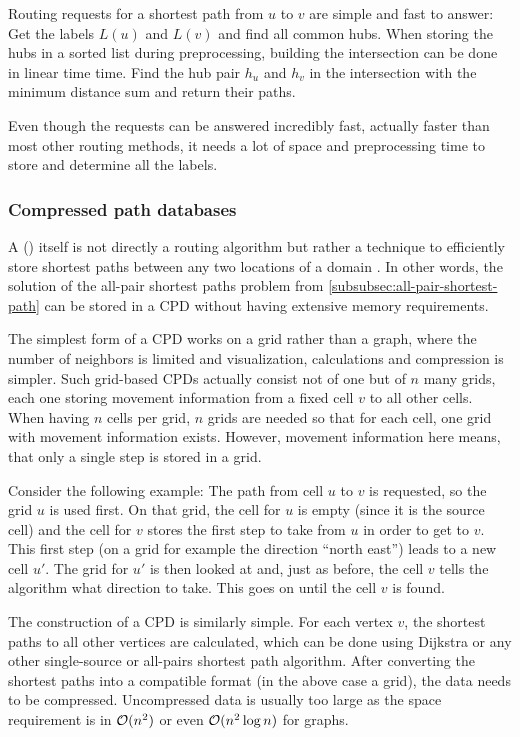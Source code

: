 			Routing requests for a shortest path from $u$ to $v$ are simple and fast to answer:
			Get the labels $L(u)$ and $L(v)$ and find all common hubs.
			When storing the hubs in a sorted list during preprocessing, building the intersection can be done in linear time time.
			Find the hub pair $h_u$ and $h_v$ in the intersection with the minimum distance sum and return their paths.
			
			Even though the requests can be answered incredibly fast, actually faster than most other routing methods, it needs a lot of space and preprocessing time to store and determine all the labels.
		
		\subsubsection{Compressed path databases}
		\label{subsubsec:cpd}
		
			A  () itself is not directly a routing algorithm but rather a technique to efficiently store shortest paths between any two locations of a domain \cite{botea-cpd-2013}.
			In other words, the solution of the all-pair shortest paths problem from \cref{subsubsec:all-pair-shortest-path} can be stored in a CPD without having extensive memory requirements.
			
			The simplest form of a CPD works on a grid rather than a graph, where the number of neighbors is limited and visualization, calculations and compression is simpler.
			Such grid-based CPDs actually consist not of one but of $n$ many grids, each one storing movement information from a fixed cell $v$ to all other cells.
			When having $n$ cells per grid, $n$ grids are needed so that for each cell, one grid with movement information exists.
			However, movement information here means, that only a single step is stored in a grid.
			
			Consider the following example:
			The path from cell $u$ to $v$ is requested, so the grid $u$ is used first.
			On that grid, the cell for $u$ is empty (since it is the source cell) and the cell for $v$ stores the first step to take from $u$ in order to get to $v$.
			This first step (on a grid for example the direction \enquote{north east}) leads to a new cell $u'$.
			The grid for $u'$ is then looked at and, just as before, the cell $v$ tells the algorithm what direction to take.
			This goes on until the cell $v$ is found.
			
			The construction of a CPD \cite{botea-cpd-2013} is similarly simple.
			For each vertex $v$, the shortest paths to all other vertices are calculated, which can be done using Dijkstra or any other single-source or all-pairs shortest path algorithm.
			After converting the shortest paths into a compatible format (in the above case a grid), the data needs to be compressed.
			Uncompressed data is usually too large as the space requirement is in $\mathcal{O}(n^2)$ or even $\mathcal{O}(n^2 \log n)$ for graphs.
			
